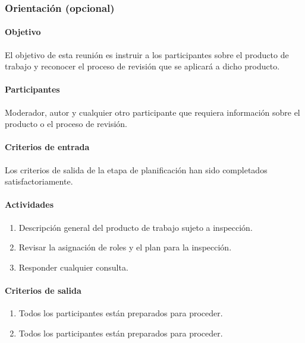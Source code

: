 \subsubsection{Orientación (opcional)}

\paragraph{Objetivo\\}

El objetivo de esta reunión es instruir a los participantes sobre el producto de trabajo y reconocer el proceso de revisión que se aplicará a dicho producto.

\paragraph{Participantes\\}

Moderador, autor y cualquier otro participante que requiera información sobre el producto o el proceso de revisión.

\paragraph{Criterios de entrada\\}

Los criterios de salida de la etapa de planificación han sido completados satisfactoriamente.

\paragraph{Actividades}

\begin{enumerate}
	\item 
		Descripción general del producto de trabajo sujeto a inspección.
	\item
		Revisar la asignación de roles y el plan para la inspección.
	\item
		Responder cualquier consulta.
\end{enumerate}

\paragraph{Criterios de salida}

\begin{enumerate}
	\item 
		Todos los participantes están preparados para proceder.
	\item
		Todos los participantes están preparados para proceder.
\end{enumerate}

